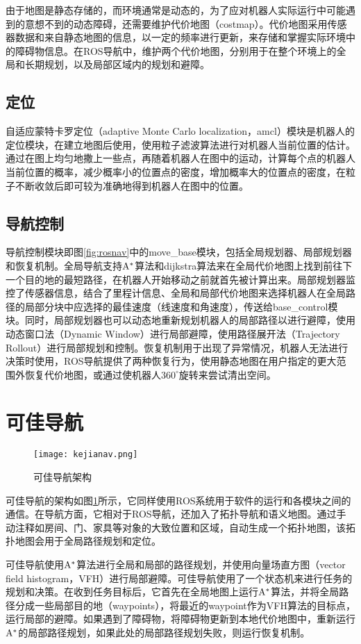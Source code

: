   由于地图是静态存储的，而环境通常是动态的，为了应对机器人实际运行中可能遇到的意想不到的动态障碍，还需要维护代价地图（costmap）。代价地图采用传感器数据和来自静态地图的信息，以一定的频率进行更新，来存储和掌握实际环境中的障碍物信息。在ROS导航中，维护两个代价地图，分别用于在整个环境上的全局和长期规划，以及局部区域内的规划和避障。

\subsection{定位}
  自适应蒙特卡罗定位（adaptive Monte Carlo localization，amcl）模块是机器人的定位模块，在建立地图后使用，使用粒子滤波算法进行对机器人当前位置的估计。通过在图上均匀地撒上一些点，再随着机器人在图中的运动，计算每个点的机器人当前位置的概率，减少概率小的位置点的密度，增加概率大的位置点的密度，在粒子不断收敛后即可较为准确地得到机器人在图中的位置。

\subsection{导航控制}

  导航控制模块即图\ref{fig:rosnav}中的move\_base模块，包括全局规划器、局部规划器和恢复机制。全局导航支持${\rm A}^\ast$算法和dijkstra算法来在全局代价地图上找到前往下一个目的地的最短路径，在机器人开始移动之前就首先被计算出来。局部规划器监控了传感器信息，结合了里程计信息、全局和局部代价地图来选择机器人在全局路径的局部分块中应选择的最佳速度（线速度和角速度），传送给base\_control模块。同时，局部规划器也可以动态地重新规划机器人的局部路径以进行避障，使用动态窗口法（Dynamic Window）\cite{fox1997dynamic}进行局部避障，使用路径展开法（Trajectory Rollout）\cite{gerkey2008planning}进行局部规划和控制。恢复机制用于出现了异常情况，机器人无法进行决策时使用，ROS导航提供了两种恢复行为，使用静态地图在用户指定的更大范围外恢复代价地图，或通过使机器人$360^{\circ}$旋转来尝试清出空间。

\section{可佳导航}

\begin{figure}[htb]
  \centering
  \texttt{[image: kejianav.png]}
  \caption{可佳导航架构}
  \label{fig:kejianav}
\end{figure}

  可佳导航的架构如图\ref{fig:kejianav}所示，它同样使用ROS系统用于软件的运行和各模块之间的通信。在导航方面，它相对于ROS导航，还加入了拓扑导航和语义地图。通过手动注释如房间、门、家具等对象的大致位置和区域，自动生成一个拓扑地图，该拓扑地图会用于全局路径规划和定位。

  可佳导航使用${\rm A}^\ast$算法进行全局和局部的路径规划，并使用向量场直方图（vector field histogram，VFH）\cite{borenstein1991vector}进行局部避障。可佳导航使用了一个状态机来进行任务的规划和决策。在收到任务目标后，它首先在全局地图上运行${\rm A}^\ast$算法，并将全局路径分成一些局部目的地（waypoints），将最近的waypoint作为VFH算法的目标点，运行局部的避障。如果遇到了障碍物，将障碍物更新到本地代价地图中，重新运行${\rm A}^\ast$的局部路径规划，如果此处的局部路径规划失败，则运行恢复机制\cite{liu2017wrighteagle}。
